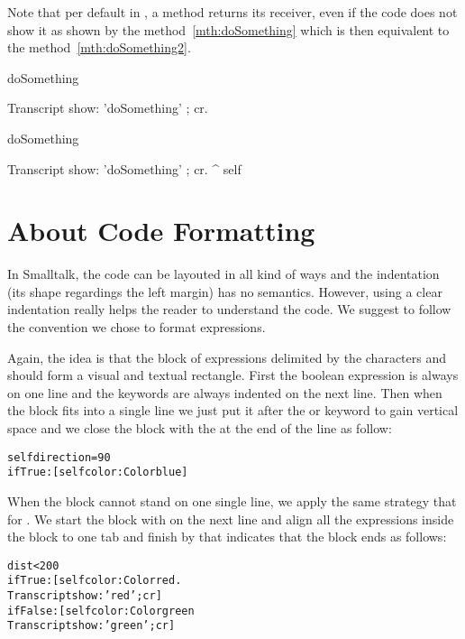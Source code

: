 Note that per default in \sq, a method returns its receiver, even if the code does not show it as shown by the method~\ref{mth:doSomething} which is then equivalent to the method~\ref{mth:doSomething2}.

\begin{method}\label{mth:doSomething}
doSomething

   Transcript show: 'doSomething' ; cr.
\end{method}

\begin{method}\label{mth:doSomething2}
doSomething

   Transcript show: 'doSomething' ; cr.
   ^ self
\end{method}

\section{About Code Formatting}
In Smalltalk, the code can be layouted in all kind of ways and the indentation (its shape regardings the left margin) has no semantics. However, using a clear indentation really helps the reader to understand the code. We suggest to follow the convention we chose to format  expressions.

Again, the idea is that the block of expressions delimited by the characters \ct{[} and \ct{]} should form a visual and textual rectangle. First the boolean expression is always on one line and the keywords are always indented on the next line. Then when  the block fits into a single line we just put it after the  or  keyword to gain vertical space and we close the block with the \ct{]} at the end of the line as follow:

\begin{alltt}
self direction = 90
      ifTrue: [self color: Color blue]
\end{alltt}

When the block cannot stand on one single line, we apply the same strategy that for . We start the block with \ct{[} on the next line  and align all the expressions inside the block to one tab and finish by \ct{]} that indicates that the block ends as follows: 

\begin{alltt}
dist < 200
      ifTrue: [self color: Color red.
              Transcript show: 'red' ; cr]
      ifFalse: [self color: Color green
               Transcript show: 'green' ; cr]
\end{alltt}





\ifx\wholebook\relax\else\fi





